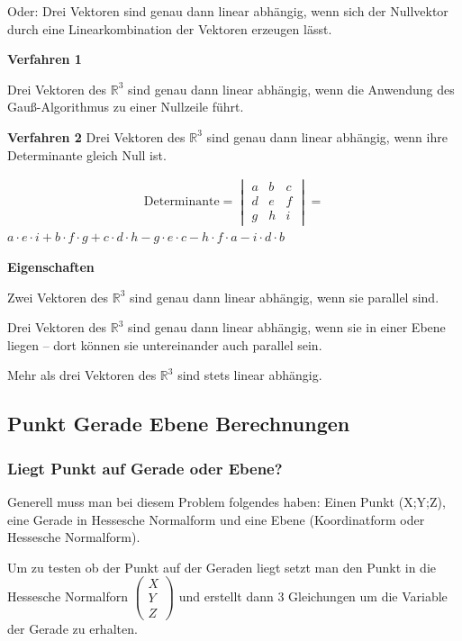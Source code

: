 \begin{multicols}{2}
    Oder: Drei Vektoren sind genau dann linear abhängig, wenn sich der Nullvektor durch eine Linearkombination der Vektoren erzeugen lässt.

    \textbf{Verfahren 1}

    Drei Vektoren des $\mathbb{R}^3$ sind genau dann linear abhängig, wenn die Anwendung des Gauß-Algorithmus zu einer Nullzeile führt.

    \textbf{Verfahren 2}
    Drei Vektoren des $\mathbb{R}^3$ sind genau dann linear abhängig, wenn ihre Determinante gleich Null ist.

    \begin{align*} \text{Determinante}= \begin{vmatrix} a & b & c \\ d & e & f \\ g & h & i \end{vmatrix}=\end{align*}
    $a \cdot e \cdot i + b \cdot f \cdot g + c \cdot d \cdot h - g \cdot e \cdot c - h \cdot f \cdot a - i \cdot d \cdot b$

    \textbf{Eigenschaften}

    Zwei Vektoren des $\mathbb{R}^3$ sind genau dann linear abhängig, wenn sie parallel sind.

    Drei Vektoren des $\mathbb{R}^3$ sind genau dann linear abhängig, wenn sie in einer Ebene liegen – dort können sie untereinander auch parallel sein.

    Mehr als drei Vektoren des $\mathbb{R}^3$ sind stets linear abhängig.

    \subsection{Punkt Gerade Ebene Berechnungen}
    \subsubsection{Liegt Punkt auf Gerade oder Ebene?}
    Generell muss man bei diesem Problem folgendes haben: Einen Punkt (X;Y;Z), eine Gerade in Hessesche Normalform und eine Ebene
    (Koordinatform oder Hessesche Normalform).

    Um zu testen ob der Punkt auf der Geraden liegt setzt man den Punkt in die Hessesche Normalforn $\begin{pmatrix} X \\ Y \\ Z \end{pmatrix}$ und erstellt dann
    3 Gleichungen um die Variable der Gerade zu erhalten.


\end{multicols}
